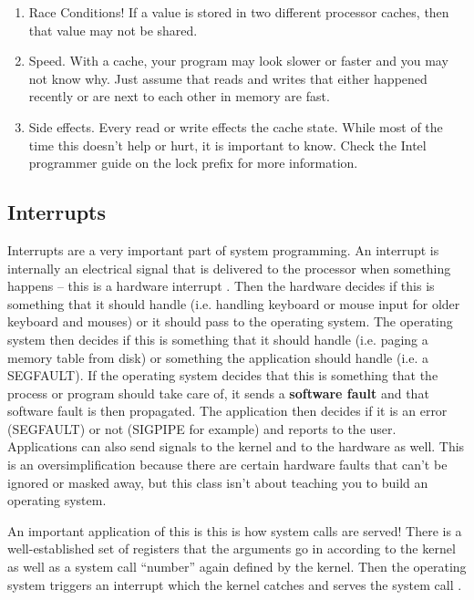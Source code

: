 \begin{enumerate}
\item Race Conditions! If a value is stored in two different processor caches, then that value may not be shared.
\item Speed. With a cache, your program may look slower or faster and you may not know why. Just assume that reads and writes that either happened recently or are next to each other in memory are fast.
\item Side effects. Every read or write effects the cache state. While most of the time this doesn't help or hurt, it is important to know. Check the Intel programmer guide on the lock prefix for more information.
\end{enumerate}

\subsection{Interrupts}

Interrupts are a very important part of system programming.
An interrupt is internally an electrical signal that is delivered to the processor when something happens -- this is a hardware interrupt \cite{redhat_hardware_int}.
Then the hardware decides if this is something that it should handle (i.e. handling keyboard or mouse input for older keyboard and mouses) or it should pass to the operating system.
The operating system then decides if this is something that it should handle (i.e. paging a memory table from disk) or something the application should handle (i.e. a SEGFAULT).
If the operating system decides that this is something that the process or program should take care of, it sends a \textbf{software fault} and that software fault is then propagated.
The application then decides if it is an error (SEGFAULT) or not (SIGPIPE for example) and reports to the user.
Applications can also send signals to the kernel and to the hardware as well.
This is an oversimplification because there are certain hardware faults that can't be ignored or masked away, but this class isn't about teaching you to build an operating system.

An important application of this is this is how system calls are served!
There is a well-established set of registers that the arguments go in according to the kernel as well as a system call ``number'' again defined by the kernel.
Then the operating system triggers an interrupt which the kernel catches and serves the system call \cite{garg_2006}.

